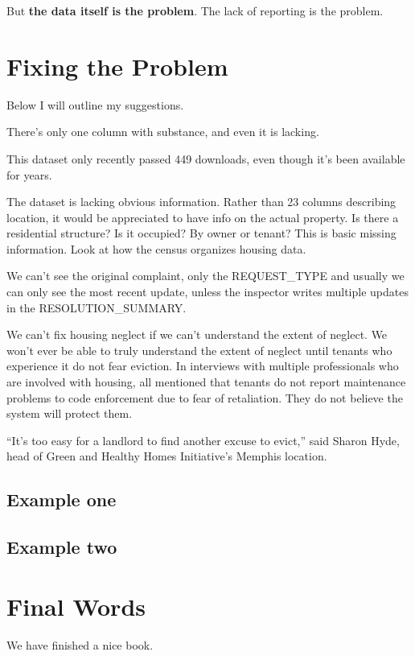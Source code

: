 \documentclass[
]{book}
\begin{document}
But \textbf{the data itself is the problem}. The lack of reporting is the problem.

\hypertarget{fixing-the-problem}{%
\chapter{Fixing the Problem}\label{fixing-the-problem}}

Below I will outline my suggestions.

There's only one column with substance, and even it is lacking.

This dataset only recently passed 449 downloads, even though it's been available for years.

The dataset is lacking obvious information. Rather than 23 columns describing location, it would be appreciated to have info on the actual property. Is there a residential structure? Is it occupied? By owner or tenant? This is basic missing information. Look at how the census organizes housing data.

We can't see the original complaint, only the REQUEST\_TYPE and usually we can only see the most recent update, unless the inspector writes multiple updates in the RESOLUTION\_SUMMARY.

We can't fix housing neglect if we can't understand the extent of neglect. We won't ever be able to truly understand the extent of neglect until tenants who experience it do not fear eviction. In interviews with multiple professionals who are involved with housing, all mentioned that tenants do not report maintenance problems to code enforcement due to fear of retaliation. They do not believe the system will protect them.

``It's too easy for a landlord to find another excuse to evict,'' said Sharon Hyde, head of Green and Healthy Homes Initiative's Memphis location.

\hypertarget{example-one}{%
\section{Example one}\label{example-one}}

\hypertarget{example-two}{%
\section{Example two}\label{example-two}}

\hypertarget{final-words}{%
\chapter{Final Words}\label{final-words}}

We have finished a nice book.

  
\end{document}
